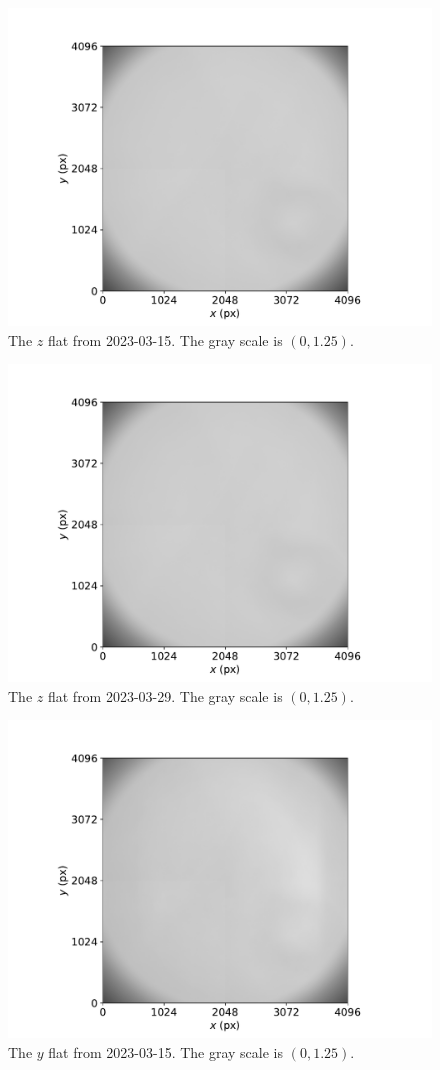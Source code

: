 \documentclass{article}
\begin{document}
\begin{figure}[pb]
\begin{center}
\includegraphics[width=0.7\columnwidth]{figures/flat-z-20230315.pdf}
\medskip
\caption{The $z$ flat from 2023-03-15. The gray scale is $(0,1.25)$.}
\label{figure:flat-z-20230315}
\end{center}
\end{figure}

\begin{figure}[pb]
\begin{center}
\includegraphics[width=0.7\columnwidth]{figures/flat-z-20230329.pdf}
\medskip
\caption{The $z$ flat from 2023-03-29. The gray scale is $(0,1.25)$.}
\label{figure:flat-z-20230329}
\end{center}
\end{figure}

\begin{figure}[pb]
\begin{center}
\includegraphics[width=0.7\columnwidth]{figures/flat-y-20230315.pdf}
\medskip
\caption{The $y$ flat from 2023-03-15. The gray scale is $(0,1.25)$.}
\label{figure:flat-y-20230315}
\end{center}
\end{figure}
\end{document}
